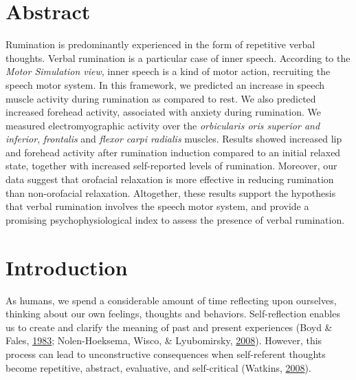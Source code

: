 \documentclass[a4paper,12pt,twoside,openright,oldfontcommands]{memoir}
\begin{document}
\section{Abstract}\label{abstract-1}

Rumination is predominantly experienced in the form of repetitive verbal
thoughts. Verbal rumination is a particular case of inner speech.
According to the \emph{Motor Simulation view}, inner speech is a kind of
motor action, recruiting the speech motor system. In this framework, we
predicted an increase in speech muscle activity during rumination as
compared to rest. We also predicted increased forehead activity,
associated with anxiety during rumination. We measured electromyographic
activity over the \emph{orbicularis oris superior and inferior},
\emph{frontalis} and \emph{flexor carpi radialis} muscles. Results
showed increased lip and forehead activity after rumination induction
compared to an initial relaxed state, together with increased
self-reported levels of rumination. Moreover, our data suggest that
orofacial relaxation is more effective in reducing rumination than
non-orofacial relaxation. Altogether, these results support the
hypothesis that verbal rumination involves the speech motor system, and
provide a promising psychophysiological index to assess the presence of
verbal rumination.

\section{Introduction}\label{introduction}

As humans, we spend a considerable amount of time reflecting upon
ourselves, thinking about our own feelings, thoughts and behaviors.
Self-reflection enables us to create and clarify the meaning of past and
present experiences (Boyd \& Fales,
\protect\hyperlink{ref-boyd_reflective_1983}{1983}; Nolen-Hoeksema,
Wisco, \& Lyubomirsky,
\protect\hyperlink{ref-Nolen-Hoeksema2008}{2008}). However, this process
can lead to unconstructive consequences when self-referent thoughts
become repetitive, abstract, evaluative, and self-critical (Watkins,
\protect\hyperlink{ref-Watkins2008}{2008}).
\end{document}
